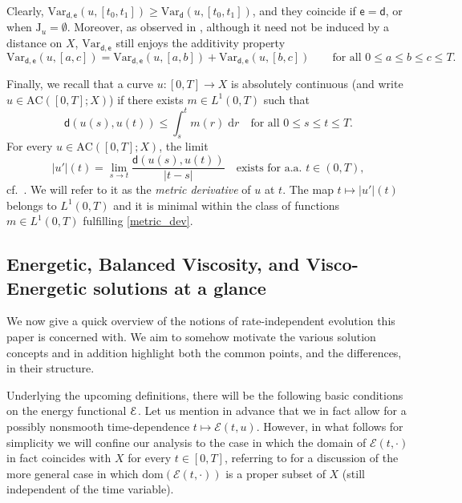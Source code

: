 \documentclass[a4paper,10pt,reqno]{amsart} %
\numberwithin{equation}{section}
\def\dd{\;\!\mathrm{d}} %
\newcommand{\Xs}{X}
\newcommand{\AC}{\mathrm{AC}}
\newcommand{\mdn}{\mathsf{d}}
\newcommand{\md}[2]{\mathsf{d}(#1,#2)}
\newcommand{\ene}[2]{\mathcal{E}(#1,#2)}
\newcommand{\Vari}[4]{\mathrm{Var}_{#1}(#2,[#3,#4])}
\newcommand{\Varname}[1]{\mathrm{Var}_{#1}}
\newcommand{\jump}[1]{\mathrm{J}_{#1}}
\newcommand{\gcostname}{\mathsf{e}}
\begin{document}
\par
Clearly, 
$\Vari {\mdn,\gcostname}u{t_0}{t_1} \geq \Vari {\mdn}u{t_0}{t_1}$, and they coincide if $\gcostname = \mdn$, or when $\jump u =\emptyset$. Moreover,   as observed in 
\cite{SavMin16},  although it need not be induced by a distance on $\Xs$,
$\Varname{\mdn,\gcostname} $  still enjoys the additivity property
\[
 \Vari {\mdn,\gcostname}u{a}{c} =  \Vari {\mdn,\gcostname}u{a}{b} +  \Vari {\mdn,\gcostname}u{b}{c} \qquad \text{for all } 0\leq a \leq  b \leq c \leq T.
\]
\par
Finally,
we recall that  a 
curve $u: [0,T]\to \Xs$ is absolutely continuous 
(and write $u\in \AC([0,T];\Xs)$)
if there exists $m\in L^1(0,T)$ such that
\begin{equation}\label{metric_dev}
\md{u(s)}{u(t)}\leq \int_s^t m(r)\dd r \quad \text{for all $0\leq s\leq
t\leq T.$}
\end{equation}
For every  $u
\in\AC([0,T];\Xs) $, the limit
\begin{equation}
\label{m-derivative}
|u'|(t) = \lim_{s\to t}\frac{\mdn(u(s),u(t))}{|t-s|}
\quad \text{exists for a.a. } t\in (0,T),
\end{equation}
cf.\ \cite[Sec.\ 1.1]{AGS08}.
 We will refer to it as the {\it metric
derivative} of $u$ at $t$. The map
 $t \mapsto|u'|(t)$  belongs to $ L^1(0,T) $
and it is minimal within the class of functions $m\in L^1(0,T)$
fulfilling \eqref{metric_dev}. 
\subsection{Energetic, Balanced Viscosity, and Visco-Energetic solutions at a glance}
\label{ss:2.2}
We now give a quick overview of the notions of rate-independent evolution this paper is concerned with.
We aim to  somehow motivate the various solution concepts and in addition
 highlight both the common points, and the differences,  in their structure.
 \par
  Underlying the upcoming definitions, there will be the following
  basic conditions on the energy functional ${\mathcal E}$. Let us mention in advance 
that we in fact allow for a possibly nonsmooth time-dependence $t\mapsto \ene tu$.
 However, in what follows for simplicity we will confine our analysis to the case in which the  domain of $\ene t{\cdot} $  in fact coincides with $\Xs$ for every $t\in [0,T]$, referring to \cite[Rmk.\ 2.7]{SavMin16} for a discussion of the more general case in which $\mathrm{dom}( \ene t{\cdot} )$ is a proper subset of $\Xs$ (still independent of  the time variable). 
\end{document}

